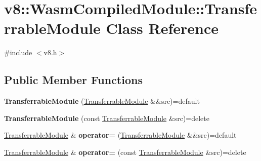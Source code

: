 \hypertarget{classv8_1_1WasmCompiledModule_1_1TransferrableModule}{}\section{v8\+:\+:Wasm\+Compiled\+Module\+:\+:Transferrable\+Module Class Reference}
\label{classv8_1_1WasmCompiledModule_1_1TransferrableModule}


{\ttfamily \#include $<$v8.\+h$>$}

\subsection*{Public Member Functions}
\begin{DoxyCompactItemize}
\item 
\mbox{\label{classv8_1_1WasmCompiledModule_1_1TransferrableModule_a39191d4a06efd63b850b5b280c3303dd}} 
{\bfseries Transferrable\+Module} (\mbox{\hyperlink{classv8_1_1WasmCompiledModule_1_1TransferrableModule}{Transferrable\+Module}} \&\&src)=default
\item 
\mbox{\label{classv8_1_1WasmCompiledModule_1_1TransferrableModule_a484367522ea3138f229f27c185c6b98d}} 
{\bfseries Transferrable\+Module} (const \mbox{\hyperlink{classv8_1_1WasmCompiledModule_1_1TransferrableModule}{Transferrable\+Module}} \&src)=delete
\item 
\mbox{\label{classv8_1_1WasmCompiledModule_1_1TransferrableModule_a243f770c3135d9f64a43edbd894d7475}} 
\mbox{\hyperlink{classv8_1_1WasmCompiledModule_1_1TransferrableModule}{Transferrable\+Module}} \& {\bfseries operator=} (\mbox{\hyperlink{classv8_1_1WasmCompiledModule_1_1TransferrableModule}{Transferrable\+Module}} \&\&src)=default
\item 
\mbox{\label{classv8_1_1WasmCompiledModule_1_1TransferrableModule_a4517a8ed7869bada6517b2376740b6d6}} 
\mbox{\hyperlink{classv8_1_1WasmCompiledModule_1_1TransferrableModule}{Transferrable\+Module}} \& {\bfseries operator=} (const \mbox{\hyperlink{classv8_1_1WasmCompiledModule_1_1TransferrableModule}{Transferrable\+Module}} \&src)=delete
\end{DoxyCompactItemize}
